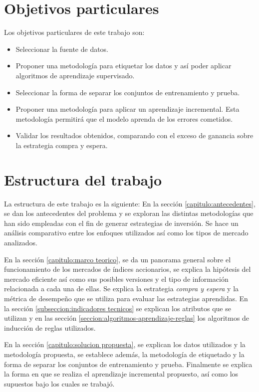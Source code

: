 \documentclass[12pt]{report}
\theoremstyle{break}
\theoremstyle{break}
\begin{document}
\section{Objetivos particulares}
\label{seccion:Objetivos particulares}
Los objetivos particulares de este trabajo son:
\begin{itemize}

\item Seleccionar la fuente de datos.

\item Proponer una metodología para etiquetar los datos y así poder aplicar algoritmos de aprendizaje supervisado.

\item Seleccionar la forma de separar los conjuntos de entrenamiento y prueba.

\item Proponer una metodología para aplicar un aprendizaje incremental. Esta metodología permitirá que el modelo aprenda de los errores cometidos.

\item Validar los resultados obtenidos, comparando con el exceso de ganancia sobre la estrategia compra y espera.
\end{itemize}

\section{Estructura del trabajo}
\label{seccion:estructura del trabajo}
La estructura de este trabajo es la siguiente:
En la sección \ref{capitulo:antecedentes}, se dan los antecedentes del problema y se exploran las distintas metodologías que han sido empleadas con el fin de generar estrategias de inversión. Se hace un análisis comparativo entre los enfoques utilizados así como los tipos de mercado analizados.

En la sección \ref{capitulo:marco teorico}, se da un panorama general sobre el funcionamiento de los mercados de índices accionarios, se explica la hipótesis del mercado eficiente así como sus posibles versiones y el tipo de información relacionada a cada una de ellas. Se explica la estrategia \textit{compra y espera} y la métrica de desempeño que se utiliza para evaluar las estrategias aprendidas. En la sección \ref{subseccion:indicadores tecnicos} se explican los atributos que se utilizan y en las sección \ref{seccion:algoritmos-aprendizaje-reglas} los algoritmos de inducción de reglas utilizados.

En la sección \ref{capitulo:solucion propuesta}, se explican los datos utilizados y la metodología propuesta, se establece además, la metodología de etiquetado y la forma de separar los conjuntos de entrenamiento y prueba. Finalmente se explica la forma en que se realiza el aprendizaje incremental propuesto, así como los supuestos bajo los cuales se trabajó.
\end{document}
